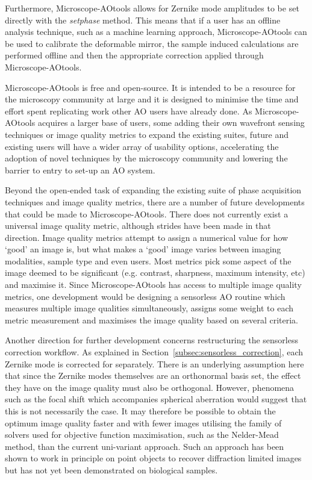 Furthermore, Microscope-AOtools allows for Zernike mode amplitudes to be 
set directly with the \textit{set\textunderscore phase} method. This means 
that if a user has an offline analysis technique, such as a machine 
learning approach, Microscope-AOtools can be used to calibrate the 
deformable mirror, the sample induced calculations are performed offline 
and then the appropriate correction applied through Microscope-AOtools.

Microscope-AOtools is free and open-source. It is intended to be a resource 
for the microscopy community at large and it is designed to minimise the 
time and effort spent replicating work other AO users have already done. As 
Microscope-AOtools acquires a larger base of users, some adding their own 
wavefront sensing techniques or image quality metrics to expand the 
existing suites, future and existing users will have a wider array of 
usability options, accelerating the adoption of novel techniques by the 
microscopy community and lowering the barrier to entry to set-up an AO 
system.

Beyond the open-ended task of expanding the existing suite of phase 
acquisition techniques and image quality metrics, there are a number of 
future developments that could be made to Microscope-AOtools. There does 
not currently exist a universal image quality metric, although strides have 
been made in that direction\cite{antonello2020multi}. Image quality metrics 
attempt to assign a numerical value for how `good' an image is, but what 
makes a `good' image varies between imaging modalities, sample type and 
even users. Most metrics pick some aspect of the image deemed to be 
significant (e.g. contrast, sharpness, maximum intensity, etc) and maximise 
it. Since Microscope-AOtools has access to multiple image quality metrics, 
one development would be designing a sensorless AO routine which measures 
multiple image qualities simultaneously, assigns some weight to each metric 
measurement and maximises the image quality based on several criteria.

Another direction for further development concerns restructuring the 
sensorless correction workflow. As explained in 
Section~\ref{subsec:sensorless_correction}, each Zernike mode is corrected 
for separately. There is an underlying assumption here that since the 
Zernike modes themselves are an orthonormal basis set, the effect they have 
on the image quality must also be orthogonal. However, phenomena such as 
the focal shift which accompanies spherical aberration would suggest that 
this is not necessarily the case\cite{torok1997role}. It may therefore be 
possible to obtain the optimum image quality faster and with fewer images 
utilising the family of solvers used for objective function maximisation, 
such as the Nelder-Mead method, than the current uni-variant 
approach\cite{nelder1965simplex}. Such an approach has been shown to work 
in principle on point objects to recover diffraction limited images but has 
not yet been demonstrated on biological samples\cite{murray2005wavefront}.

